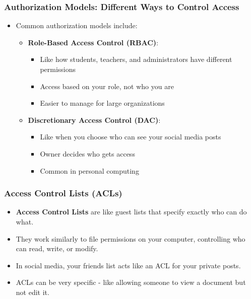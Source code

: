 \documentclass{beamer}
\begin{document}
\begin{frame}
    \frametitle{Authorization Models: Different Ways to Control Access}
    \begin{itemize}
        \item Common authorization models include:
            \begin{itemize}
                \item \textbf{Role-Based Access Control (RBAC)}:
                    \begin{itemize}
                        \item Like how students, teachers, and administrators have different permissions
                        \item Access based on your role, not who you are
                        \item Easier to manage for large organizations
                    \end{itemize}
                \item \textbf{Discretionary Access Control (DAC)}:
                    \begin{itemize}
                        \item Like when you choose who can see your social media posts
                        \item Owner decides who gets access
                        \item Common in personal computing
                    \end{itemize}
            \end{itemize}
    \end{itemize}
\end{frame}

\begin{frame}
    \frametitle{Access Control Lists (ACLs)}
    \begin{itemize}
        \item \textbf{Access Control Lists} are like guest lists that specify exactly who can do what.
        \item They work similarly to file permissions on your computer, controlling who can read, write, or modify.
        \item In social media, your friends list acts like an ACL for your private posts.
        \item ACLs can be very specific - like allowing someone to view a document but not edit it.
    \end{itemize}
\end{frame}
\end{document}
